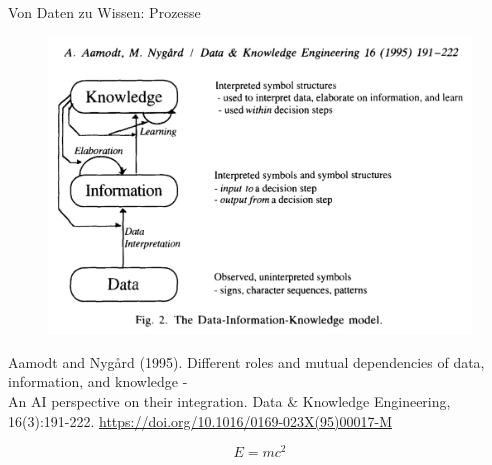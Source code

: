 \documentclass{beamer}
\begin{document}
\begin{frame}{Von Daten zu Wissen: Prozesse}
	
	\begin{figure}
		\includegraphics[scale=0.23,center]{aamodt-nygard-dik.png}
	\end{figure}	
	
	\vspace{0.1cm}
	\tiny
	\begin{flushright}
		Aamodt and Nyg{\aa}rd (1995). Different roles and mutual dependencies of data, information, and knowledge -\\An AI perspective on their integration. Data \& Knowledge Engineering, 16(3):191-222. \url{https://doi.org/10.1016/0169-023X(95)00017-M}\\
	\end{flushright}
	
\end{frame}

\begin{frame}[plain]{}
	
	\Huge
	\begin{center}
		\begin{displaymath}
		E = mc^2
		\end{displaymath}	
	\end{center}
	
\end{frame}
\end{document}
